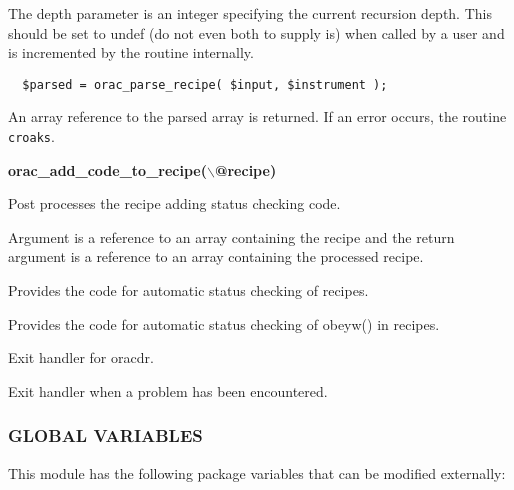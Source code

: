 \begin{description}
The depth parameter is an integer specifying the current recursion
depth. This should be set to undef (do not even both to supply is)
when called by a user and is incremented by the routine internally.

\begin{verbatim}
  $parsed = orac_parse_recipe( $input, $instrument );
\end{verbatim}


An array reference to the parsed array is returned. If an error 
occurs, the routine \texttt{croaks}.

\item \textbf{\textbf{orac\_add\_code\_to\_recipe}($\backslash$@recipe)}

Post processes the recipe adding status checking code.



Argument is a reference to an array containing the recipe
and the return argument is a reference to an array containing
the processed recipe.

\item[\textbf{orac\_check\_status}] \mbox{}

Provides the code for automatic status checking of recipes.

\item[\textbf{orac\_check\_obey\_status}] \mbox{}

Provides the code for automatic status checking of obeyw()
in recipes.

\item[\textbf{orac\_exit\_normally}] \mbox{}

Exit handler for oracdr.

\item[\textbf{orac\_exit\_abnormally}] \mbox{}

Exit handler when a problem has been encountered.

\end{description}
\subsubsection*{GLOBAL VARIABLES\label{ORAC::Basic_GLOBAL_VARIABLES}}

This module has the following package variables that can be modified
externally:

